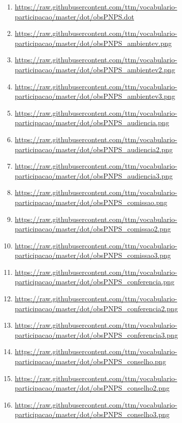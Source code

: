 \documentclass[12pt]{article}
\begin{document}
{\begin{enumerate}
    \item  \url{https://raw.githubusercontent.com/ttm/vocabulario-participacao/master/dot/obsPNPS.dot}\label{i:76}
    \item  \url{https://raw.githubusercontent.com/ttm/vocabulario-participacao/master/dot/obsPNPS_ambientev.png}\label{i:76b}
    \item  \url{https://raw.githubusercontent.com/ttm/vocabulario-participacao/master/dot/obsPNPS_ambientev2.png}\label{i:76c}
    \item  \url{https://raw.githubusercontent.com/ttm/vocabulario-participacao/master/dot/obsPNPS_ambientev3.png}\label{i:76d}
    \item  \url{https://raw.githubusercontent.com/ttm/vocabulario-participacao/master/dot/obsPNPS_audiencia.png}\label{i:76e}
    \item  \url{https://raw.githubusercontent.com/ttm/vocabulario-participacao/master/dot/obsPNPS_audiencia2.png}\label{i:76f}
    \item  \url{https://raw.githubusercontent.com/ttm/vocabulario-participacao/master/dot/obsPNPS_audiencia3.png}\label{i:76g}
    \item  \url{https://raw.githubusercontent.com/ttm/vocabulario-participacao/master/dot/obsPNPS_comissao.png}\label{i:76h}
    \item  \url{https://raw.githubusercontent.com/ttm/vocabulario-participacao/master/dot/obsPNPS_comissao2.png}\label{i:76i}
    \item  \url{https://raw.githubusercontent.com/ttm/vocabulario-participacao/master/dot/obsPNPS_comissao3.png}\label{i:76j}
    \item  \url{https://raw.githubusercontent.com/ttm/vocabulario-participacao/master/dot/obsPNPS_conferencia.png}\label{i:76k}
    \item  \url{https://raw.githubusercontent.com/ttm/vocabulario-participacao/master/dot/obsPNPS_conferencia2.png}\label{i:76l}
    \item  \url{https://raw.githubusercontent.com/ttm/vocabulario-participacao/master/dot/obsPNPS_conferencia3.png}\label{i:76m}
    \item  \url{https://raw.githubusercontent.com/ttm/vocabulario-participacao/master/dot/obsPNPS_conselho.png}\label{i:76n}
    \item  \url{https://raw.githubusercontent.com/ttm/vocabulario-participacao/master/dot/obsPNPS_conselho2.png}\label{i:76o}
    \item  \url{https://raw.githubusercontent.com/ttm/vocabulario-participacao/master/dot/obsPNPS_conselho3.png}\label{i:76p}

\end{enumerate}}
\end{document}
